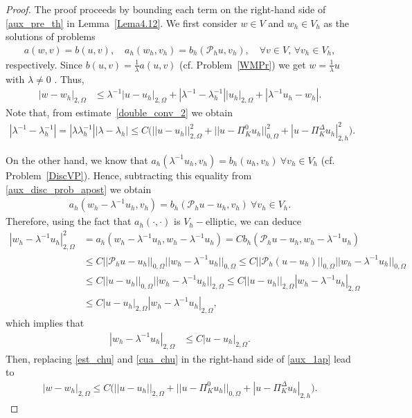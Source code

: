 \documentclass[10pt,a4paper]{amsart}
\def\O{\Omega}
\def\PiK{\Pi_{K}^{\Delta}}
\begin{document}
\begin{proof}
The proof proceeds by bounding each term on the right-hand side of  \eqref{aux_pre_th} in  Lemma~\ref{Lema4.12}. We first consider $w\in V$ and $w_h\in V_h$ as the solutions of problems
\begin{align}
a(w,v)=b(u,v), \quad
a_h(w_h,v_h)=b_h(\mathcal{P}_hu,v_h), \quad \forall v\in V,\, \forall v_h \in V_h \label{aux_disc_prob_apost},
\end{align}
respectively. Since $b(u,v)=\frac{1}{\lambda}a(u,v)$ (cf. Problem~\ref{WMPr}) we get $w=\frac{1}{\lambda}
u$ with $\lambda\neq 0$ . Thus, 
\begin{align}
|w-w_h|_{2,\O}&\leq \lambda^{-1}|u-u_h|_{2,\O}+|\lambda^{-1}-\lambda_h^{-1}||u_h|_{2,\O}+|\lambda^{-1}u_h-w_h|.\label{aux_1ap} 
\end{align}
Note that, from estimate~\ref{double_conv_2} we obtain
\begin{align}
|\lambda^{-1}-\lambda_h^{-1}|=|\lambda\lambda_{h}^{-1}||\lambda-\lambda_h|\leq C\Big( ||u-u_h||_{2,\Omega}^2 + ||u-\Pi_K^0 u_h||_{0,\Omega}^2 + |u- \PiK u_h|_{2,h}^2 \Big)\label{est_chu}.
\end{align}

On the other hand, we know that $a_h(\lambda^{-1}u_h,v_h)=b_h(u_h,v_h)\ \forall v_h \in V_h $ (cf. Problem~\ref{DiscVP}). Hence, subtracting this equality from \eqref{aux_disc_prob_apost} we obtain 
\begin{align*}
a_h(w_h-\lambda^{-1}u_h,v_h)=b_h(\mathcal{P}_hu-u_h,v_h) \ \forall v_h \in V_h .
\end{align*}
Therefore, using the fact that $a_h(\cdot,\cdot)$ is $V_h-$elliptic, we can deduce
\begin{align}
|w_h-\lambda^{-1}u_h|_{2,\O}^2&=a_h(w_h-\lambda^{-1}u_h,w_h-\lambda^{-1}u_h)=Cb_h(\mathcal{P}_hu-u_h,w_h-\lambda^{-1}u_h)\nonumber\\
&\leq C || \mathcal{P}_hu-u_h||_{0,\O}||w_h-\lambda^{-1}u_h ||_{0,\O}\leq C || \mathcal{P}_h(u-u_h)||_{0,\O}||w_h-\lambda^{-1}u_h ||_{0,\O}\nonumber\\
&\leq C ||u-u_h||_{0,\O} ||w_h-\lambda^{-1}u_h ||_{2,\O}\leq C ||u-u_h||_{2,\O} |w_h-\lambda^{-1}u_h |_{2,\O}\nonumber\\
&\leq C |u-u_h|_{2,\O} |w_h-\lambda^{-1}u_h |_{2,\O},\nonumber
\end{align}
which implies that
\begin{align}
|w_h-\lambda^{-1}u_h|_{2,\O}&\leq C |u-u_h|_{2,\O} .\label{cua_chu}
\end{align}
Then, replacing \eqref{est_chu} and \eqref{cua_chu} in the right-hand side of \eqref{aux_1ap} lead to
\begin{align}
|w-w_h|_{2,\O}\leq C\Big( ||u-u_h||_{2,\Omega} + ||u-\Pi_K^0 u_h||_{0,\Omega} + |u- \PiK u_h|_{2,h}\Big)\label{1stToBound}.
\end{align}


\end{proof}
\end{document}
